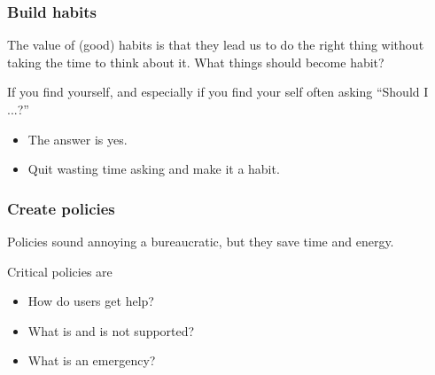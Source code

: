 \documentclass[10pt]{beamer}
\begin{document}
\begin{frame}
  \frametitle{Build habits}
  
    The value of (good) habits is that they lead us to do the right thing without 
    taking the time to think about it. What things should become habit?   
    
    If you find yourself, and especially if you find your self often asking ``Should I ...?''
    \begin{itemize}
      \item The answer is yes.
      \item Quit wasting time asking and make it a habit.
    \end{itemize}
     
\end{frame}

\begin{frame}
  \frametitle{Create policies}
  
    Policies sound annoying a bureaucratic, but they save time and energy.
    
    Critical policies are 
    
    \begin{itemize}
      \item How do users get help?
      \item What is and is not supported?
      \item What is an emergency?
    \end{itemize}
     
\end{frame}
\end{document}
